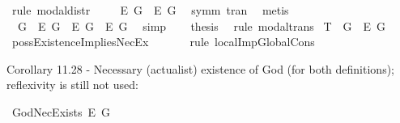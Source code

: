 \begin{isabellebody}
\ {\isacharparenleft}rule\ modal{\isacharunderscore}distr{\isacharparenright}\isanewline
\ \ \isamarkupfalse%
\ {}{\isacharcolon}\ {\isachardoublequoteopen}{\isasymlfloor}\isactrlbold {\isasymdiamond}\isactrlbold {\isasymbox}\isactrlbold {\isasymexists}\isactrlsup E\ G\ \isactrlbold {\isasymrightarrow}\ \isactrlbold {\isasymbox}\isactrlbold {\isasymexists}\isactrlsup E\ G{\isasymrfloor}{\isachardoublequoteclose}\ \isamarkupfalse%
\ symm\ tran\ \isamarkupfalse%
\ metis\ %
\isanewline
\ \ \isamarkupfalse%
\ {}\ {}\ \isamarkupfalse%
\ {\isachardoublequoteopen}{\isasymlfloor}\isactrlbold {\isasymdiamond}\isactrlbold {\isasymexists}\ G\ \isactrlbold {\isasymrightarrow}\ \isactrlbold {\isasymdiamond}\isactrlbold {\isasymbox}\isactrlbold {\isasymexists}\isactrlsup E\ G{\isasymrfloor}\ {\isasymand}\ {\isasymlfloor}\isactrlbold {\isasymdiamond}\isactrlbold {\isasymbox}\isactrlbold {\isasymexists}\isactrlsup E\ G\ \isactrlbold {\isasymrightarrow}\ \isactrlbold {\isasymbox}\isactrlbold {\isasymexists}\isactrlsup E\ G{\isasymrfloor}{\isachardoublequoteclose}\ \isamarkupfalse%
\ simp\isanewline
\ \ \isamarkupfalse%
\ {\isacharquery}thesis\ \isamarkupfalse%
\ {\isacharparenleft}rule\ modal{\isacharunderscore}trans{\isacharparenright}\isanewline
{}\isamarkupfalse%
%
\endisatagproof
{\isafoldproof}%
%
\isadelimproof
\isanewline
%
\endisadelimproof
\isanewline
{}\isamarkupfalse%
\ T{}{\isacharcolon}\ {\isachardoublequoteopen}{\isasymlfloor}\isactrlbold {\isasymdiamond}\isactrlbold {\isasymexists}\ G{\isasymrfloor}\ {\isasymlongrightarrow}\ {\isasymlfloor}\isactrlbold {\isasymbox}\isactrlbold {\isasymexists}\isactrlsup E\ G{\isasymrfloor}{\isachardoublequoteclose}%
\isadelimproof
\ %
\endisadelimproof
%
\isatagproof
{}\isamarkupfalse%
\ possExistenceImpliesNecEx\ \isanewline
\ \ \ \ \isamarkupfalse%
\ {\isacharparenleft}rule\ localImpGlobalCons{\isacharparenright}\ \ %
%
\endisatagproof
{\isafoldproof}%
%
\isadelimproof
%
\endisadelimproof
%
\begin{isamarkuptext}%
Corollary 11.28 - Necessary (actualist) existence of God (for both definitions); reflexivity is still not used:%
\end{isamarkuptext}\isamarkuptrue%
\isamarkupfalse%
\ GodNecExists{\isacharcolon}\ {\isachardoublequoteopen}{\isasymlfloor}\isactrlbold {\isasymbox}\isactrlbold {\isasymexists}\isactrlsup E\ G{\isasymrfloor}{\isachardoublequoteclose}%

\end{isabellebody}
